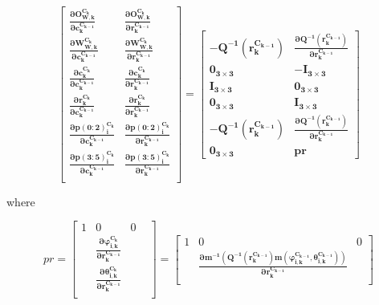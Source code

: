 \begin{equation}
\begin{bmatrix}
\boldsymbol{\frac{\partial O_{W,k}^{C_{k}}}{\partial c_{k}^{C_{k-1}}}} & 
\boldsymbol{\frac{\partial O_{W,k}^{C_{k}}}{\partial r_{k}^{C_{k-1}}}} \\
\boldsymbol{\frac{\partial W_{W,k}^{C_{k}}}{\partial c_{k}^{C_{k-1}}}} &
\boldsymbol{\frac{\partial W_{W,k}^{C_{k}}}{\partial r_{k}^{C_{k-1}}}} \\
\boldsymbol{\frac{\partial c_{k}^{C_{k}}}{\partial c_{k}^{C_{k-1}}}} & 
\boldsymbol{\frac{\partial c_{k}^{C_{k}}}{\partial r_{k}^{C_{k-1}}}} \\
\boldsymbol{\frac{\partial r_{k}^{C_{k}}}{\partial c_{k}^{C_{k-1}}}} & 
\boldsymbol{\frac{\partial r_{k}^{C_{k}}}{\partial r_{k}^{C_{k-1}}}} \\
\boldsymbol{\frac{\partial p(0:2)_{i}^{C_{k}}}{\partial c_{k}^{C_{k-1}}}} & 
\boldsymbol{\frac{\partial p(0:2)_{i}^{C_{k}}}{\partial r_{k}^{C_{k-1}}}} \\
\boldsymbol{\frac{\partial p(3:5)_{i}^{C_{k}}}{\partial c_{k}^{C_{k-1}}}} & 
\boldsymbol{\frac{\partial p(3:5)_{i}^{C_{k}}}{\partial r_{k}^{C_{k-1}}}} \\
\end{bmatrix}= \begin{bmatrix}
-\boldsymbol{Q^{-1}(r_{k}^{C_{k-1}})} & 
\boldsymbol{\frac{\partial Q^{-1}(r_{k}^{C_{k-1}})}{\partial r_{k}^{C_{k-1}}}} \\
\boldsymbol{0_{3\times 3}} & -\boldsymbol{I_{3\times 3}} \\
\boldsymbol{I_{3\times 3}} & \boldsymbol{0_{3\times 3}} \\
\boldsymbol{0_{3\times 3}} & \boldsymbol{I_{3\times 3}} \\
\boldsymbol{-Q^{-1}(r_{k}^{C_{k-1}})} & 
\boldsymbol{\frac{\partial Q^{-1}(r_{k}^{C_{k-1}})}{\partial r_{k}^{C_{k-1}}}} \\
\boldsymbol{0_{3\times 3}} & \boldsymbol{pr} 
\end{bmatrix}
\end{equation}

\noindent where

\begin{equation}
pr=\begin{bmatrix}
1 & 0 & 0 & \\
&\boldsymbol{\frac{\partial \varphi _{i, k}^{C_k}}{\partial r_{k}^{C_{k-1}}}} & \\
&\boldsymbol{\frac{\partial \theta _{i, k}^{C_k}}{\partial r_{k}^{C_{k-1}}}} & \\
\end{bmatrix}= \begin{bmatrix}
1 & 0 & 0 \\
&\boldsymbol{\frac{\partial m^{-1}(Q^{-1}(r_{k}^{C_{k-1}})m(\varphi _{i, 
k}^{C_{k-1}}, \theta _{i, k}^{C_{k-1}}))}{\partial r_{k}^{C_{k-1}}}} & \\
\end{bmatrix}
\end{equation}

